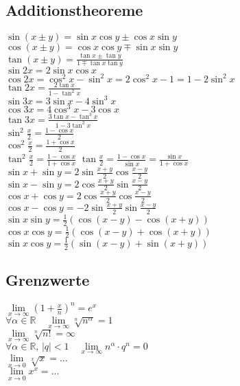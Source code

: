 \documentclass[landscape, 10pt]{article}
\newcommand{\R}{\mathbb{R}}
\begin{document}
\begin{multicols}{3}

\subsection{Additionstheoreme}
$\sin(x\pm y)=\sin x\cos y\pm\cos x\sin y$\\
$\cos(x\pm y)=\cos x\cos y\mp\sin x\sin y$\\
$\tan(x\pm y)=\frac{\tan x\pm\tan y}{1\mp\tan x\tan y}$\\
$\sin 2x=2\sin x\cos x$\\
$\cos 2x=\cos^2x-\sin^2x=2\cos^2x-1=1-2\sin^2x$\\
$\tan 2x=\frac{2\tan x}{1-\tan^2x}$\\
$\sin 3x=3\sin x-4\sin^3x$\\
$\cos 3x=4\cos^3x-3\cos x$\\
$\tan 3x=\frac{3\tan x-\tan^3x}{1-3\tan^2 x}$\\
$\sin^2\frac{x}{2}=\frac{1-\cos x}{2}$\\
$\cos^2\frac{x}{2}=\frac{1+\cos x}{2}$\\
$\tan^2\frac{x}{2}=\frac{1-\cos x}{1+\cos x}$
$\tan\frac{x}{2}=\frac{1-\cos x}{\sin x}=\frac{\sin x}{1+\cos x}$\\
$\sin x+\sin y=2\sin\frac{x+y}{2}\cos\frac{x-y}{2}$\\
$\sin x-\sin y=2\cos\frac{x+y}{2}\sin\frac{x-y}{2}$\\
$\cos x+\cos y=2\cos\frac{x+y}{2}\cos\frac{x-y}{2}$\\
$\cos x-\cos y=-2\sin\frac{x+y}{2}\sin\frac{x-y}{2}$\\
$\sin x\sin y=\frac{1}{2}(\cos(x-y)-\cos(x+y))$\\
$\cos x\cos y=\frac{1}{2}(\cos(x-y)+\cos(x+y))$\\
$\sin x\cos y=\frac{1}{2}(\sin(x-y)+\sin(x+y))$

\subsection{Grenzwerte}
$\lim\limits_{x\to\infty}(1+\frac{x}{n})^n=e^x$\\
$\forall\alpha\in\R\quad\lim\limits_{x\to\infty}\sqrt[n]{n^\alpha}=1$\\
$\lim\limits_{x\to\infty}\sqrt[n]{n!}=\infty$\\
$\forall\alpha\in\R,\,|q|<1\quad\lim\limits_{x\to\infty}n^\alpha\cdot q^n=0$\\
$\lim\limits_{x\to0}\sqrt[x]x=...$\\
$\lim\limits_{x\to0}x^x=...$\\
\end{multicols}
\end{document}
